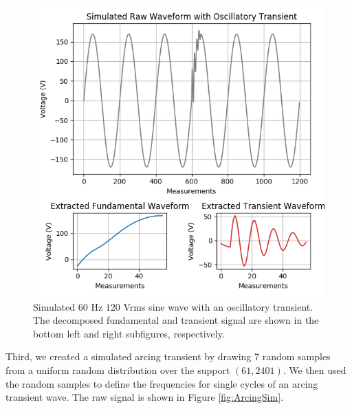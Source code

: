 \documentclass[10pt, conference, compsocconf]{IEEEtran}
\begin{document}
\begin{figure}[ht]
\centering%
\includegraphics[scale=0.35]{./figures/oscillatory_sim.png}
\caption{Simulated $60$ Hz $120$ Vrms sine wave with an oscillatory transient. The decomposed fundamental and transient signal are shown in the bottom left and right subfigures, respectively.}\label{fig:OscillatorySim}
\end{figure}

Third, we created a simulated arcing transient by drawing 7 random samples from a uniform random distribution over the support $(61, 2401)$. We then used the random samples to define the frequencies for single cycles of an arcing transient wave. The raw signal is shown in Figure \ref{fig:ArcingSim}.
\end{document}

